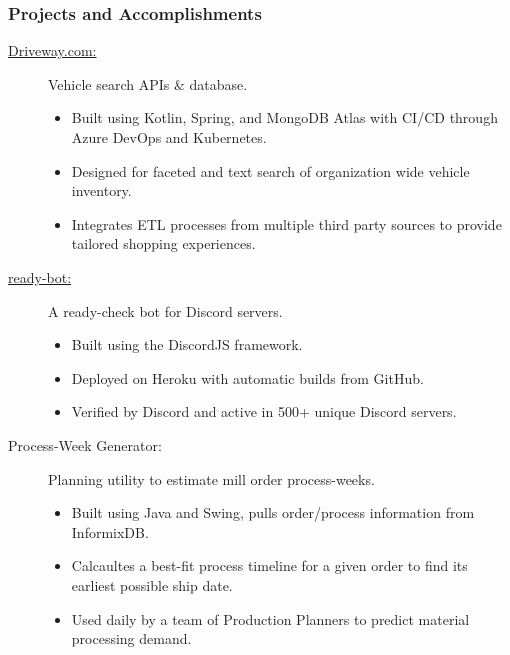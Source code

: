 \documentclass{article}
\begin{document}
\subsubsection*{Projects and Accomplishments}
    \begin{description}

        \item[\href{https://driveway.com/shop}{Driveway.com:\hspace{0.075in}}] Vehicle search APIs \& database.
            \begin{itemize}
                \item Built using Kotlin, Spring, and MongoDB Atlas with CI/CD through Azure DevOps and Kubernetes.
                \item Designed for faceted and text search of organization wide vehicle inventory.
                \item Integrates ETL processes from multiple third party sources to provide tailored shopping experiences.
            \end{itemize}

            \vspace{0.5em}
        \item[\href{https://www.github.com/BurnsCommaLucas/ready-bot}{ready-bot:\hspace{0.075in}}] A ready-check bot for Discord servers.
            \begin{itemize}
                \item Built using the DiscordJS framework.
                \item Deployed on Heroku with automatic builds from GitHub.
                \item Verified by Discord and active in 500+ unique Discord servers.
            \end{itemize}

            \vspace{0.5em}

        \item[Process-Week Generator:] Planning utility to estimate mill order process-weeks.
            \begin{itemize}
                \item Built using Java and Swing, pulls order/process information from InformixDB.
                \item Calcaultes a best-fit process timeline for a given order to find its earliest possible ship date.
                \item Used daily by a team of Production Planners to predict material processing demand.
            \end{itemize}


\end{description}
\end{document}
